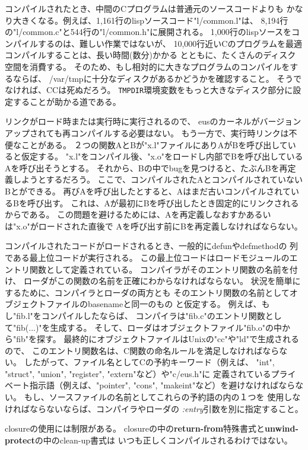 コンパイルされたとき、中間のCプログラムは普通元のソースコードよりも
かなり大きくなる。例えば、1,161行のlispソースコード"l/common.l"は、
8,194行の"l/common.c"と544行の"l/common.h"に展開される。
1,000行のlispソースをコンパイルするのは、難しい作業ではないが、
10,000行近いCのプログラムを最適コンパイルすることは、長い時間(数分)かかる
とともに、たくさんのディスク空間を消費する。
そのため、もし相対的に大きなプログラムのコンパイルをするならば、
/var/tmpに十分なディスクがあるかどうかを確認すること。
そうでなければ、CCは死ぬだろう。
{\tt TMPDIR}環境変数をもっと大きなディスク部分に設定することが助かる道である。

リンクがロード時または実行時に実行されるので、
eusのカーネルがバージョンアップされても再コンパイルする必要はない。
もう一方で、実行時リンクは不便なことがある。
２つの関数AとBが"x.l"ファイルにありAがBを呼び出していると仮定する。
"x.l"をコンパイル後、"x.o"をロードし内部でBを呼び出しているAを呼び出そうとする。
それから、Bの中でbugを見つけると、たぶんBを再定義しようとするだろう。
ここで、コンパイルされたAとコンパイルされていないBとができる。
再びAを呼び出したとすると、Aはまだ古いコンパイルされているBを呼び出す。
これは、Aが最初にBを呼び出したとき固定的にリンクされるからである。
この問題を避けるためには、Aを再定義しなおすかあるいは"x.o"がロードされた直後で
Aを呼び出す前にBを再定義しなければならない。

コンパイルされたコードがロードされるとき、一般的にdefunやdefmethodの
列である最上位コードが実行される。
この最上位コードはロードモジュールのエントリ関数として定義されている。
コンパイラがそのエントリ関数の名前を付け、
ローダがこの関数の名前を正確にわからなければならない。
状況を簡単にするために、コンパイラとローダの両方とも
そのエントリ関数の名前としてオブジェクトファイルのbasenameと同一のもの
と仮定する。
例えば、もし"fib.l"をコンパイルしたならば、
コンパイラは"fib.c"のエントリ関数として"fib(...)"を生成する。
そして、ローダはオブジェクトファイル"fib.o"の中から"fib"を探す。
最終的にオブジェクトファイルはUnixの"cc"や"ld"で生成されるので、
このエントリ関数名は、C関数の命名ルールを満足しなければならない。
したがって、ファイル名としてCの予約キーワード（例えば、
"int", "struct", "union", "register", "extern"など）や"c/eus.h"に
定義されているプライベート指示語（例えば、"pointer", "cons",
"makeint"など）を避けなければならない。
もし、ソースファイルの名前としてこれらの予約語の内の１つを
使用しなければならないならば、コンパイラやローダの
{\em :entry}引数を別に指定すること。

closureの使用には制限がある。
closureの中の{\bf return-from}特殊書式と{\bf unwind-protect}の中のclean-up書式は
いつも正しくコンパイルされるわけではない。


